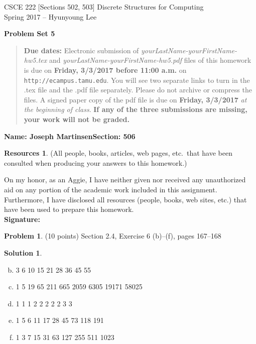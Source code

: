 \documentclass{article}
\theoremstyle{definition}
\newtheorem{problem}{Problem}
\newtheorem*{solution}{Solution}
\newtheorem*{resources}{Resources}
\newcommand{\name}[2]{\noindent\textbf{Name: #1}\hfill \textbf{Section: #2}}
\newcommand{\honor}{\noindent On my honor, as an Aggie, I have neither
  given nor received any unauthorized aid on any portion of the
  academic work included in this assignment. Furthermore, I have
  disclosed all resources (people, books, web sites, etc.) that have
  been used to prepare this homework. \\[2ex]
 \textbf{Signature:} \underline{\hspace*{10cm}} }
\newcommand{\problemset}[1]{\begin{center}\textbf{Problem Set #1}\end{center}}
\newcommand{\duedate}[2]{\begin{quote}\textbf{Due dates:} Electronic
    submission of \textsl{yourLastName-yourFirstName-hw5.tex} and 
    \textsl{yourLastName-yourFirstName-hw5.pdf} files of this homework is due on
    \textbf{#1} on \texttt{http://ecampus.tamu.edu}. You will see two separate links
    to turn in the .tex file and the .pdf file separately. Please do not archive or compress the files.  
    A signed paper copy of the pdf file is due on \textbf{#2} \textsl{at the beginning of class}.
    \textbf{If any of the three submissions are missing, your work will not be graded.}\end{quote} }
\begin{document}
\vspace*{-15mm}
\begin{center}
{\large
CSCE 222 [Sections 502, 503] Discrete Structures for Computing\\[.5ex]
Spring 2017 -- Hyunyoung Lee\\}
\end{center}
\problemset{5}
\duedate{Friday, 3/3/2017 before 11:00 a.m.}{Friday, 3/3/2017}
\name{Joseph Martinsen}{506}
\begin{resources} (All people, books, articles, web pages, etc.\ that
  have been consulted when producing your answers to this homework.)
\end{resources}
\honor

\smallskip

\begin{problem} (10 points) 
Section 2.4, Exercise 6 (b)--(f), pages 167--168
\end{problem}
\begin{solution}\ \\
\begin{enumerate}[a)]
  \setcounter{enumi}{1}
  \item
                               3
                               6
                               10
                               15
                               21
                               28
                               36
                               45
                               55
  
  \item
                                1
                               5
                               19
                               65
                              211
                              665
                              2059
                              6305
                             19171
                             58025

  \item
                                 1
                               1
                               1
                               2
                               2
                               2
                               2
                               2
                               3
                               3

  \item
                               1
                               5
                               6
                               11
                               17
                               28
                               45
                               73
                              118
                              191

  \item
  1 3 7 15 31 63 127 255 511 1023
\end{enumerate}
\end{solution}
\end{document}
